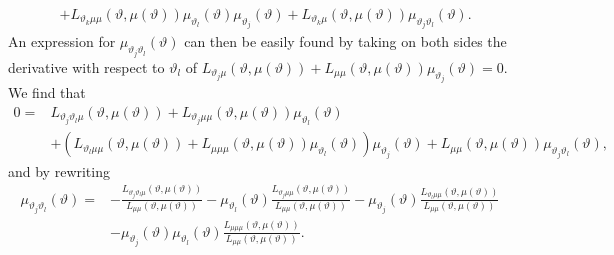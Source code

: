 {{\begin{align}
&+   L_{\vartheta_k  \mu \mu}(\vartheta,\mu(\vartheta)) \mu_{\vartheta_l}(\vartheta) \mu_{\vartheta_j}(\vartheta)
+ L_{\vartheta_k  \mu}(\vartheta,\mu(\vartheta)) \mu_{\vartheta_j \vartheta_l}(\vartheta).  \label{genproofqw14}
\end{align}
An expression for $ \mu_{\vartheta_j \vartheta_l}(\vartheta)$ can then be easily found by taking on both sides the derivative with respect to $\vartheta_l$ of $L_{\vartheta_j \mu}(\vartheta,\mu(\vartheta)) + L_{\mu \mu}(\vartheta,\mu(\vartheta)) \mu_{\vartheta_j}(\vartheta) = 0$. We find that
\begin{align*}
  0 = &L_{\vartheta_j \vartheta_l \mu }(\vartheta,\mu(\vartheta)) + L_{ \vartheta_j \mu \mu  }(\vartheta,\mu(\vartheta)) \mu_{\vartheta_l}(\vartheta) \\ &+ 
   \left(  L_{\vartheta_l \mu \mu}(\vartheta,\mu(\vartheta)) +  L_{\mu \mu \mu }(\vartheta,\mu(\vartheta))  \mu_{\vartheta_l}(\vartheta) \right) \mu_{\vartheta_j}(\vartheta) 
   + L_{\mu \mu}(\vartheta,\mu(\vartheta)) \mu_{\vartheta_j \vartheta_l}(\vartheta), 
\end{align*}
and by rewriting 
\begin{align*}
    \mu_{\vartheta_j \vartheta_l}(\vartheta) = &-\frac{L_{ \vartheta_j \vartheta_l \mu}(\vartheta,\mu(\vartheta))}{L_{\mu \mu}(\vartheta,\mu(\vartheta))} -  \mu_{\vartheta_l}(\vartheta)  \frac{  L_{ \vartheta_j  \mu \mu }(\vartheta,\mu(\vartheta))}{L_{\mu \mu}(\vartheta,\mu(\vartheta))}  - \mu_{\vartheta_j}(\vartheta)  \frac{  L_{\vartheta_l \mu \mu }(\vartheta,\mu(\vartheta)) }{L_{\mu \mu}(\vartheta,\mu(\vartheta))} \\
    &-  \mu_{\vartheta_j}(\vartheta) \mu_{\vartheta_l}(\vartheta)  \frac{  L_{\mu \mu \mu }(\vartheta,\mu(\vartheta)) }{L_{\mu \mu}(\vartheta,\mu(\vartheta))}.  
\end{align*}

}}
